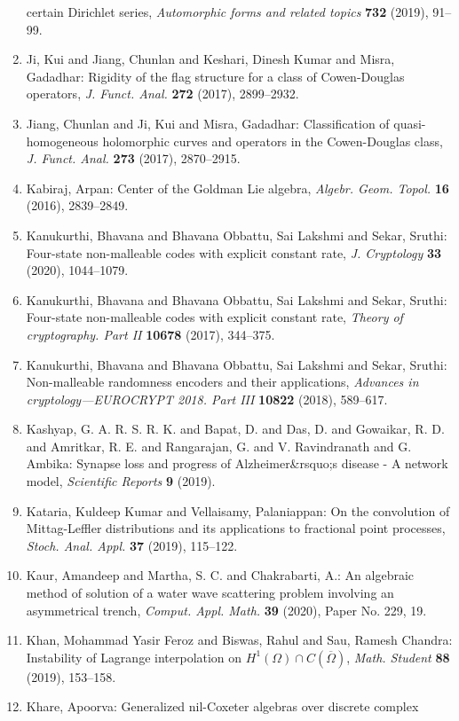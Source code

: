 \begin{enumerate}
certain {D}irichlet series, \emph{Automorphic forms and related topics} {\bf 732} (2019), 91--99.
\item Ji, Kui and Jiang, Chunlan and Keshari, Dinesh Kumar and
Misra, Gadadhar: Rigidity of the flag structure for a class of
{C}owen-{D}ouglas operators, \emph{J. Funct. Anal.} {\bf 272} (2017), 2899--2932.
\item Jiang, Chunlan and Ji, Kui and Misra, Gadadhar: Classification of quasi-homogeneous holomorphic curves and
operators in the {C}owen-{D}ouglas class, \emph{J. Funct. Anal.} {\bf 273} (2017), 2870--2915.
\item Kabiraj, Arpan: Center of the {G}oldman {L}ie algebra, \emph{Algebr. Geom. Topol.} {\bf 16} (2016), 2839--2849.
\item Kanukurthi, Bhavana and Bhavana Obbattu, Sai Lakshmi and
Sekar, Sruthi: Four-state non-malleable codes with explicit constant rate, \emph{J. Cryptology} {\bf 33} (2020), 1044--1079.
\item Kanukurthi, Bhavana and Bhavana Obbattu, Sai Lakshmi and
Sekar, Sruthi: Four-state non-malleable codes with explicit constant rate, \emph{Theory of cryptography. {P}art {II}} {\bf 10678} (2017), 344--375.
\item Kanukurthi, Bhavana and Bhavana Obbattu, Sai Lakshmi and
Sekar, Sruthi: Non-malleable randomness encoders and their applications, \emph{Advances in cryptology---{EUROCRYPT} 2018. {P}art {III}} {\bf 10822} (2018), 589--617.
\item Kashyap, G. A. R. S. R. K. and Bapat, D. and Das, D. and Gowaikar, R. D. and  Amritkar, R. E. and Rangarajan, G. and V. Ravindranath and G. Ambika: Synapse loss and progress of Alzheimer&rsquo;s disease - A network model, \emph{Scientific Reports} {\bf 9} (2019).
\item Kataria, Kuldeep Kumar and Vellaisamy, Palaniappan: On the convolution of {M}ittag-{L}effler distributions and its
applications to fractional point processes, \emph{Stoch. Anal. Appl.} {\bf 37} (2019), 115--122.
\item Kaur, Amandeep and Martha, S. C. and Chakrabarti, A.: An algebraic method of solution of a water wave scattering
problem involving an asymmetrical trench, \emph{Comput. Appl. Math.} {\bf 39} (2020), Paper No. 229, 19.
\item Khan, Mohammad Yasir Feroz and Biswas, Rahul and Sau, Ramesh
Chandra: Instability of {L}agrange interpolation on {$H^1(\Omega)\cap
C(\overline\Omega)$}, \emph{Math. Student} {\bf 88} (2019), 153--158.
\item Khare, Apoorva: Generalized nil-{C}oxeter algebras over discrete complex

\end{enumerate}
